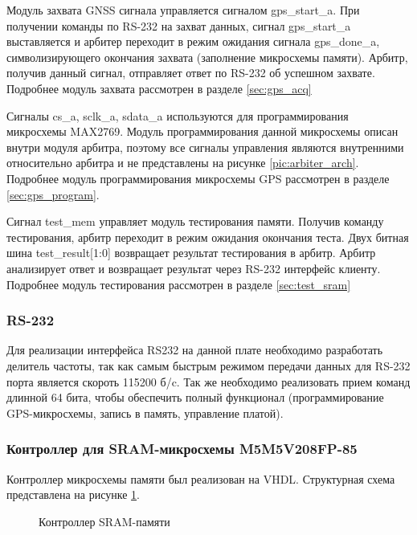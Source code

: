Модуль захвата GNSS сигнала управляется сигналом gps\_start\_a.
При получении команды по RS-232 на захват данных, сигнал gps\_start\_a выставляется
и арбитер переходит в режим ожидания сигнала gps\_done\_a, символизирующего окончания захвата (заполнение микросхемы памяти).
Арбитр, получив данный сигнал, отправляет ответ по RS-232 об успешном захвате. Подробнее модуль захвата рассмотрен в разделе
\ref{sec:gps_acq}

Сигналы cs\_a, sclk\_a, sdata\_a используются для программирования микросхемы MAX2769. Модуль программирования данной микросхемы
описан внутри модуля арбитра, поэтому все сигналы управления являются внутренними относительно арбитра и не представлены на рисунке
\ref{pic:arbiter_arch}. Подробнее модуль программирования микросхемы GPS рассмотрен в разделе \ref{sec:gps_program}.

Сигнал test\_mem управляет модуль тестирования памяти. Получив команду тестирования, арбитр переходит в режим ожидания окончания теста.
Двух битная шина test\_result[1:0] возвращает результат тестирования в арбитр. Арбитр анализирует ответ и возвращает результат 
через RS-232 интерфейс клиенту. Подробнее модуль тестирования рассмотрен в разделе \ref{sec:test_sram}

\subsubsection{RS-232}
\label{razdel3_rs232}
Для реализации интерфейса RS232 на данной плате необходимо разработать делитель частоты, так как самым быстрым режимом передачи данных
для RS-232 порта является скороть 115200 б/c. Так же необходимо реализовать прием команд длинной 64 бита, чтобы обеспечить
полный функционал (программирование GPS-микросхемы, запись в память, управление платой).

\subsubsection{Контроллер для SRAM-микросхемы M5M5V208FP-85}
\label{sec:sram_controller}
Контроллер микросхемы памяти был реализован на VHDL. Структурная схема представлена на рисунке \ref{pic:sram_arch}.

\begin{figure}[H]
\begin{center}
\end{center}
\caption{Контроллер SRAM-памяти}
\label{pic:sram_arch}
\end{figure}

